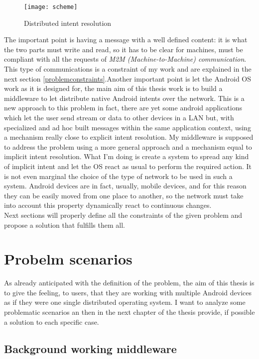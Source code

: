 \begin{figure}[h]
	\centering
	\texttt{[image: scheme]}
	\caption{Distributed intent resolution}
	\label{fig:3.1}
\end{figure}

The important point is having a message with a well defined content: it is what the two parts must write and read, so it has to be clear for machines, must be compliant with all the requests of \textit{M2M (Machine-to-Machine) communication}. This type of communications is a constraint of my work and are explained in the next section \ref{problemconstraints}.Another important point is let the Android OS work as it is designed for, the main aim of this thesis work is to build a middleware to let distribute native Android intents over the network. This is a new approach to this problem in fact, there are yet some android applications which let the user send stream or data to other devices in a LAN but, with specialized and ad hoc built messages within the same application context, using a mechanism really close to explicit intent resolution. My middleware is supposed to address the problem using a more general approach and a mechanism equal to implicit intent resolution. What I'm doing is create a system to spread any kind of implicit intent and let the OS react as usual to perform the required action.
It is not even marginal the choice of the type of network to be used in such a system. Android devices are in fact, usually, mobile devices, and for this reason they can be easily moved from one place to another, so the network must take into account this property dynamically react to continuous changes.\\
Next sections will properly define all the constraints of the given problem and propose a solution that fulfills them all.
\section{Probelm scenarios}
As already anticipated with the definition of the problem,  the aim of this thesis is to give the feeling, to users, that they are working with multiple Android devices as if they were one single distributed operating system. I want to analyze some problematic scenarios an then in the next chapter of the thesis provide, if possible a solution to each specific case.

\subsection{Background working middleware}\label{middlewarescenario}

